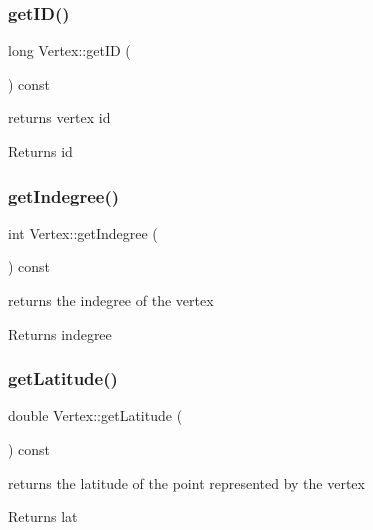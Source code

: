 \subsubsection{\texorpdfstring{get\+I\+D()}{getID()}}
{\footnotesize\ttfamily long Vertex\+::get\+ID (\begin{DoxyParamCaption}{ }\end{DoxyParamCaption}) const}



returns vertex id 

\begin{DoxyReturn}{Returns}
id 
\end{DoxyReturn}
\hypertarget{class_vertex_afd1d78d4b08162c2c470db5c7b1386f6}{}\label{class_vertex_afd1d78d4b08162c2c470db5c7b1386f6} 
\subsubsection{\texorpdfstring{get\+Indegree()}{getIndegree()}}
{\footnotesize\ttfamily int Vertex\+::get\+Indegree (\begin{DoxyParamCaption}{ }\end{DoxyParamCaption}) const}



returns the indegree of the vertex 

\begin{DoxyReturn}{Returns}
indegree 
\end{DoxyReturn}
\hypertarget{class_vertex_a7455a09de51b274867edae2254cef38d}{}\label{class_vertex_a7455a09de51b274867edae2254cef38d} 
\subsubsection{\texorpdfstring{get\+Latitude()}{getLatitude()}}
{\footnotesize\ttfamily double Vertex\+::get\+Latitude (\begin{DoxyParamCaption}{ }\end{DoxyParamCaption}) const}



returns the latitude of the point represented by the vertex 

\begin{DoxyReturn}{Returns}
lat 
\end{DoxyReturn}
\hypertarget{class_vertex_af1a2bee6c38f511cbfea082eb7149537}{}\label{class_vertex_af1a2bee6c38f511cbfea082eb7149537} 

